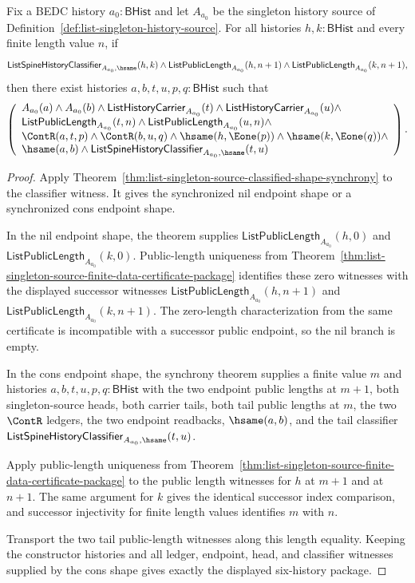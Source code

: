 \begin{theorem}
\label{thm:list-singleton-source-classified-successor-length-inversion}
Fix a BEDC history $a_0:\mathsf{BHist}$ and let $A_{a_0}$ be the singleton
history source of Definition~\ref{def:list-singleton-history-source}. For all
histories $h,k:\mathsf{BHist}$ and every finite length value $n$, if
$$
\mathsf{ListSpineHistoryClassifier}_{A_{a_0},\hsame}(h,k)\land
\mathsf{ListPublicLength}_{A_{a_0}}(h,n+1)\land
\mathsf{ListPublicLength}_{A_{a_0}}(k,n+1),
$$
then there exist histories $a,b,t,u,p,q:\mathsf{BHist}$ such that
$$
\left(
\begin{array}{l}
A_{a_0}(a)\land A_{a_0}(b)\land
\mathsf{ListHistoryCarrier}_{A_{a_0}}(t)\land
\mathsf{ListHistoryCarrier}_{A_{a_0}}(u)\land\\
\mathsf{ListPublicLength}_{A_{a_0}}(t,n)\land
\mathsf{ListPublicLength}_{A_{a_0}}(u,n)\land\\
\ContR(a,t,p)\land \ContR(b,u,q)\land
\hsame(h,\Eone(p))\land \hsame(k,\Eone(q))\land\\
\hsame(a,b)\land
\mathsf{ListSpineHistoryClassifier}_{A_{a_0},\hsame}(t,u)
\end{array}
\right).
$$
\end{theorem}
\begin{proof}
Apply Theorem~\ref{thm:list-singleton-source-classified-shape-synchrony} to the
classifier witness. It gives the synchronized nil endpoint shape or a
synchronized cons endpoint shape.

In the nil endpoint shape, the theorem supplies
$\mathsf{ListPublicLength}_{A_{a_0}}(h,0)$ and
$\mathsf{ListPublicLength}_{A_{a_0}}(k,0)$. Public-length uniqueness from
Theorem~\ref{thm:list-singleton-source-finite-data-certificate-package}
identifies these zero witnesses with the displayed successor witnesses
$\mathsf{ListPublicLength}_{A_{a_0}}(h,n+1)$ and
$\mathsf{ListPublicLength}_{A_{a_0}}(k,n+1)$. The zero-length characterization
from the same certificate is incompatible with a successor public endpoint, so
the nil branch is empty.

In the cons endpoint shape, the synchrony theorem supplies a finite value $m$
and histories $a,b,t,u,p,q:\mathsf{BHist}$ with the two endpoint public lengths
at $m+1$, both singleton-source heads, both carrier tails, both tail public
lengths at $m$, the two $\ContR$ ledgers, the two endpoint readbacks,
$\hsame(a,b)$, and the tail classifier
$\mathsf{ListSpineHistoryClassifier}_{A_{a_0},\hsame}(t,u)$.

Apply public-length uniqueness from
Theorem~\ref{thm:list-singleton-source-finite-data-certificate-package} to the
public length witnesses for $h$ at $m+1$ and at $n+1$. The same argument for
$k$ gives the identical successor index comparison, and successor injectivity
for finite length values identifies $m$ with $n$.

Transport the two tail public-length witnesses along this length equality.
Keeping the constructor histories and all ledger, endpoint, head, and classifier
witnesses supplied by the cons shape gives exactly the displayed six-history
package.
\end{proof}

